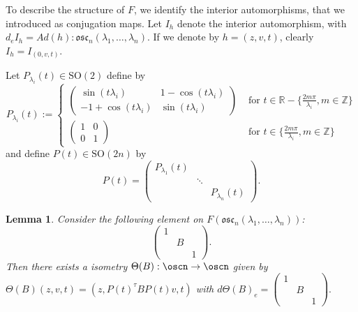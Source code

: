 \documentclass[12pt]{amsart}
\theoremstyle{plain}
\newtheorem{lem}[thm]{Lemma}
\theoremstyle{definition}
\theoremstyle{remark}
\begin{document}
To describe the structure of $F$, we identify the interior automorphisms, that we introduced as conjugation maps. Let $I_h$ denote the interior automorphism, with $d_e I_h=Ad(h): \mathfrak{osc}_n(\lambda_1, \hdots, \lambda_n)$. If we denote by $h=(z,v,t)$, clearly $I_h=I_{(0,v,t)}$.

Let $P_{\lambda_i}(t)\in \mathrm{SO}(2)$ define by
$$P_{\lambda_i}(t):=\left\{
	 \begin{array}{cl}
\left( \begin{matrix}
	\sin(t\lambda_i) & 1 -\cos(t\lambda_i)\\
-1 +\cos(t\lambda_i)  & \sin(t\lambda_i)
\end{matrix}\right) & \mbox{ for } t\in \mathbb R -\{\frac{2m\pi}{\lambda_i}, m\in \mathbb Z\}\\
 \left( \begin{matrix}
1 &0\\
0  & 1
\end{matrix}\right) & \mbox{ for } t\in\{\frac{2m\pi}{\lambda_i}, m\in \mathbb Z\}
\end{array}	
\right.
$$
and define $P(t)\in \mathrm{SO}(2n)$ by
$$P(t)=\left( \begin{matrix}
P_{\lambda_1}(t) & & \\
& \ddots & \\
& & P_{\lambda_n}(t)
\end{matrix}\right).$$

\begin{lem} Consider the following element on $F(\mathfrak{osc}_n(\lambda_1, \hdots, \lambda_n))$:
	$$\left( \begin{matrix}
	1 & & \\
	& B & \\
	& & 1
	\end{matrix}\right).$$
Then there exists a isometry $\Theta(B):\oscn \to \oscn$ given by
$\Theta(B)(z,v,t)=(z, P(t)^{\tau}BP(t)v, t)$ with $d \Theta(B)_e=\left( \begin{matrix}
1 & & \\
& B & \\
& & 1
\end{matrix}\right).$
\end{lem}
\end{document}
